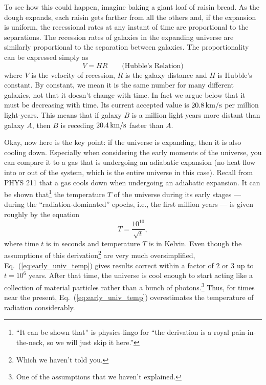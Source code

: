 To see how this could happen, imagine baking a giant loaf of raisin
bread.  As the dough expands, each raisin gets farther from all the
others and, if the expansion is uniform, the recessional rates at any
instant of time are proportional to the separations.  The recession
rates of galaxies in the expanding universe are similarly proportional
to the separation between galaxies. The proportionality can be
expressed simply as
\begin{equation}
V = HR  \qquad\mbox{(Hubble's Relation)}
\end{equation}
where $V$ is the velocity of recession, $R$ is the galaxy distance and
$H$ is Hubble's constant.  By constant, we mean it is the same number
for many different galaxies, not that it doesn't change with time.  In
fact we argue below that it must be decreasing with time.  Its current 
accepted value is $20.8\,\mbox{km/s}$ per million light-years.  
This means that if
galaxy $B$ is a million light years more distant than galaxy $A$, then $B$
is receding $20.4\,\mbox{km/s}$ faster than $A$.

Okay, now here is the key point: if the universe is expanding, then it
is also cooling down.  Especially when considering the early moments
of the universe, you can compare it to a gas that is undergoing an
adiabatic expansion (no heat flow into or out of the system, which is
the entire universe in this case).  Recall from PHYS 211 that a gas
cools down when undergoing an adiabatic expansion.  It can be shown
that\footnote{``It can be shown that'' is physics-lingo for ``the
derivation is a royal pain-in-the-neck, so we will just skip it
here.''} the temperature $T$ of the universe during its early stages
--- during the ``radiation-dominated'' epochs, i.e., the first million
years --- is given roughly by the equation
\begin{equation}
T = \frac{10^{10}}{\sqrt t},
\label{eq:early_univ_temp}
\end{equation}
where time $t$ is in seconds and temperature $T$ is in Kelvin.  Even
though the assumptions of this derivation\footnote{Which we haven't
told you.}  are very much oversimplified,
Eq.~(\ref{eq:early_univ_temp}) gives results correct within a factor
of 2 or 3 up to $t = 10^6$ years.  After that time, the universe is
cool enough to start acting like a collection of material particles
rather than a bunch of photons.\footnote{One of the assumptions that we
haven't explained.}  Thus, for times near the present,
Eq.~(\ref{eq:early_univ_temp}) overestimates the temperature of
radiation considerably.

